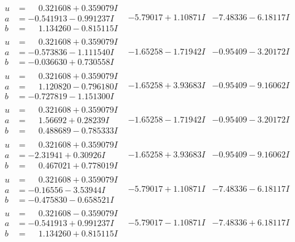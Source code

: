 \documentclass[1p]{elsarticle_modified}
\theoremstyle{definition}
\begin{document}
$$\begin{array}{c|c|c}
\begin{aligned}
u &= \phantom{-}0.321608 + 0.359079 I \\
a &= -0.541913 - 0.991237 I \\
b &= \phantom{-}1.134260 - 0.815115 I\end{aligned}
 & -5.79017 + 1.10871 I & -7.48336 - 6.18117 I \\ \hline\begin{aligned}
u &= \phantom{-}0.321608 + 0.359079 I \\
a &= -0.573836 - 1.111540 I \\
b &= -0.036630 + 0.730558 I\end{aligned}
 & -1.65258 - 1.71942 I & -0.95409 - 3.20172 I \\ \hline\begin{aligned}
u &= \phantom{-}0.321608 + 0.359079 I \\
a &= \phantom{-}1.120820 - 0.796180 I \\
b &= -0.727819 - 1.151300 I\end{aligned}
 & -1.65258 + 3.93683 I & -0.95409 - 9.16062 I \\ \hline\begin{aligned}
u &= \phantom{-}0.321608 + 0.359079 I \\
a &= \phantom{-}1.56692 + 0.28239 I \\
b &= \phantom{-}0.488689 - 0.785333 I\end{aligned}
 & -1.65258 - 1.71942 I & -0.95409 - 3.20172 I \\ \hline\begin{aligned}
u &= \phantom{-}0.321608 + 0.359079 I \\
a &= -2.31941 + 0.30926 I \\
b &= \phantom{-}0.467021 + 0.778019 I\end{aligned}
 & -1.65258 + 3.93683 I & -0.95409 - 9.16062 I \\ \hline\begin{aligned}
u &= \phantom{-}0.321608 + 0.359079 I \\
a &= -0.16556 - 3.53944 I \\
b &= -0.475830 - 0.658521 I\end{aligned}
 & -5.79017 + 1.10871 I & -7.48336 - 6.18117 I \\ \hline\begin{aligned}
u &= \phantom{-}0.321608 - 0.359079 I \\
a &= -0.541913 + 0.991237 I \\
b &= \phantom{-}1.134260 + 0.815115 I\end{aligned}
 & -5.79017 - 1.10871 I & -7.48336 + 6.18117 I \\ \hline\begin{aligned}

\end{aligned}
\end{array}$$
\end{document}
